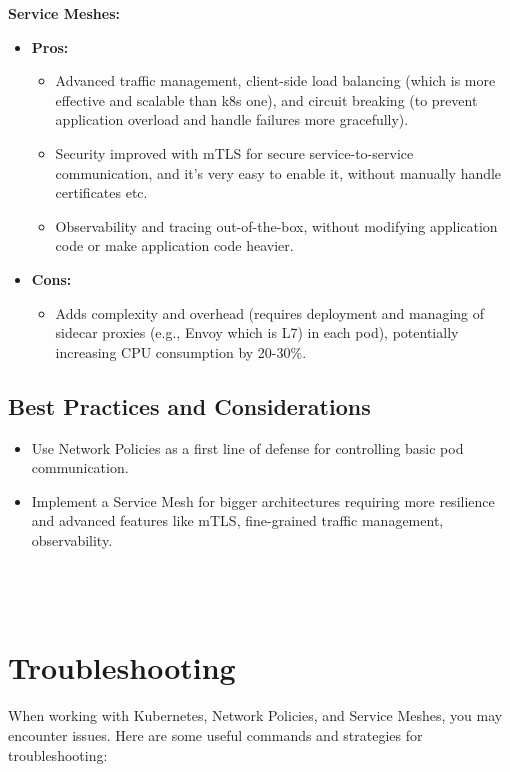 \documentclass{article}
\begin{document}
\textbf{Service Meshes:}
\begin{itemize}
\item \textbf{Pros:}
\begin{itemize}
    \item Advanced traffic management, client-side load balancing (which is more effective and scalable than k8s one), and circuit breaking (to prevent application overload and handle failures more gracefully).
    \item Security improved with mTLS for secure service-to-service communication, and it's very easy to enable it, without manually handle certificates etc.
    \item Observability and tracing out-of-the-box, without modifying application code or make application code heavier.
\end{itemize}
\item \textbf{Cons:} 
\begin{itemize}
    \item Adds complexity and overhead (requires deployment and managing of sidecar proxies (e.g., Envoy which is L7) in each pod), potentially increasing CPU consumption by 20-30\%.
\end{itemize}
\end{itemize}

\subsection{Best Practices and Considerations}
\begin{itemize}
\item Use Network Policies as a first line of defense for controlling basic pod communication.
\item Implement a Service Mesh for bigger architectures requiring more resilience and advanced features like mTLS, fine-grained traffic management, observability. \\\\\\\\
\end{itemize}

\section{Troubleshooting}

When working with Kubernetes, Network Policies, and Service Meshes, you may encounter issues. Here are some useful commands and strategies for troubleshooting:
\end{document}
